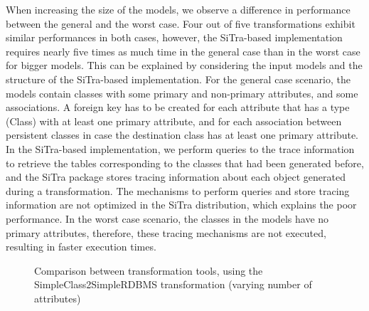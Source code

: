 \documentclass[12pt]{elsarticle}
\begin{document}
When increasing the size of the models, we observe a difference in performance
between the general and the worst case. Four out of five transformations
exhibit similar performances in both cases, however, the SiTra-based
implementation requires nearly five times as much time in the general case than
in the worst case for bigger models. This can be explained by considering the
input models and the structure of the SiTra-based implementation. For the general case scenario,
the models contain classes with some primary and non-primary attributes, and
some associations. A foreign key has to be created for each attribute that has
a type (Class) with at least one primary attribute, and for each association
between persistent classes in case the destination class has at least one
primary attribute. In the SiTra-based implementation, we perform queries to the
trace information to retrieve the tables corresponding to the classes that had
been generated before, and the SiTra package stores tracing information about
each object generated during a transformation. The mechanisms to perform
queries and store tracing information are not optimized in the SiTra
distribution, which explains the poor performance. In the worst case scenario,
the classes in the models have no primary attributes, therefore, these tracing
mechanisms are not executed, resulting in faster execution times.

\begin{figure}[thb]
\centering
{}
\caption{Comparison between transformation tools, using the
SimpleClass2SimpleRDBMS transformation (varying number of attributes)
\label{fig:classes_compared}}
\end{figure}
\end{document}
